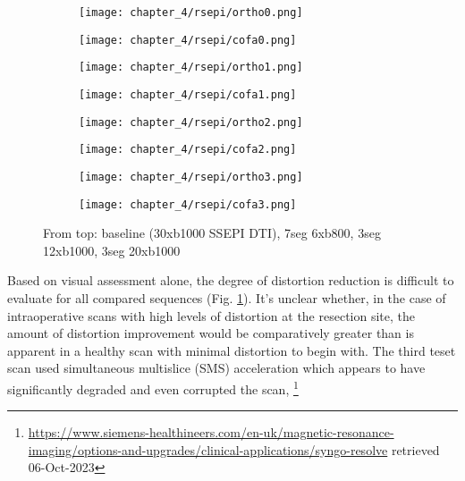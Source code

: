 \begin{figure}[h!]
  \centering
  \begin{subfigure}[b]{0.65\textwidth}
    \centering
    \texttt{[image: chapter\_4/rsepi/ortho0.png]}
  \end{subfigure}%
  \begin{subfigure}[b]{0.3\textwidth}
    \centering
    \texttt{[image: chapter\_4/rsepi/cofa0.png]}
  \end{subfigure}
  \begin{subfigure}[b]{0.65\textwidth}
    \centering
    \texttt{[image: chapter\_4/rsepi/ortho1.png]}
  \end{subfigure}%
  \begin{subfigure}[b]{0.3\textwidth}
    \centering
    \texttt{[image: chapter\_4/rsepi/cofa1.png]}
  \end{subfigure}
  \begin{subfigure}[b]{0.65\textwidth}
    \centering
    \texttt{[image: chapter\_4/rsepi/ortho2.png]}
  \end{subfigure}%
  \begin{subfigure}[b]{0.3\textwidth}
    \centering
    \texttt{[image: chapter\_4/rsepi/cofa2.png]}
  \end{subfigure}
  \begin{subfigure}[b]{0.65\textwidth}
    \centering
    \texttt{[image: chapter\_4/rsepi/ortho3.png]}
  \end{subfigure}%
  \begin{subfigure}[b]{0.3\textwidth}
    \centering
    \texttt{[image: chapter\_4/rsepi/cofa3.png]}
  \end{subfigure}
  \caption{From top: baseline (30xb1000 SSEPI DTI), 7seg 6xb800, 3seg 12xb1000, 3seg 20xb1000}
  \label{fig:rsepi}
\end{figure}

Based on visual assessment alone, the degree of distortion reduction is difficult to evaluate for all compared sequences (Fig. \ref{fig:rsepi}).
It’s unclear whether, in the case of intraoperative scans with high levels of distortion at the resection site, the amount of distortion improvement would be comparatively greater than is apparent in a healthy scan with minimal distortion to begin with.
The third teset scan used simultaneous multislice (SMS) acceleration which appears to have significantly degraded and even corrupted the scan, 
\footnote[2]{\url{https://www.siemens-healthineers.com/en-uk/magnetic-resonance-imaging/options-and-upgrades/clinical-applications/syngo-resolve} retrieved 06-Oct-2023}


